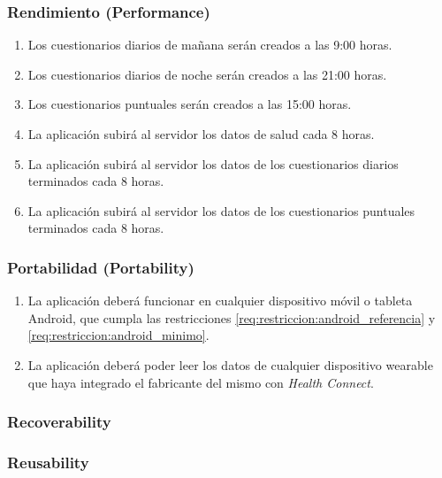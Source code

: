         \subsubsection{Rendimiento (Performance)}
            \begin{enumerate}[resume, label=\textbf{\texttt{RNF-\arabic*}}]
                \item Los cuestionarios diarios de mañana serán creados a las 9:00 horas.
                \item Los cuestionarios diarios de noche serán creados a las 21:00 horas.
                \item Los cuestionarios puntuales serán creados a las 15:00 horas.
                \item La aplicación subirá al servidor los datos de salud cada 8 horas.
                \item La aplicación subirá al servidor los datos de los cuestionarios diarios terminados cada 8 horas.
                \item La aplicación subirá al servidor los datos de los cuestionarios puntuales terminados cada 8 horas.
            \end{enumerate}
        \subsubsection{Portabilidad (Portability)}
            \begin{enumerate}[resume, label=\textbf{\texttt{RNF-\arabic*}}]
                \item La aplicación deberá funcionar en cualquier dispositivo móvil o tableta Android, que cumpla las restricciones \ref{req:restriccion:android_referencia} y \ref{req:restriccion:android_minimo}.
                \item La aplicación deberá poder leer los datos de cualquier dispositivo \gls{wearable} que haya integrado el fabricante del mismo con \textit{Health Connect}.
            \end{enumerate}
        \subsubsection{Recoverability}
        \subsubsection{Reusability}
